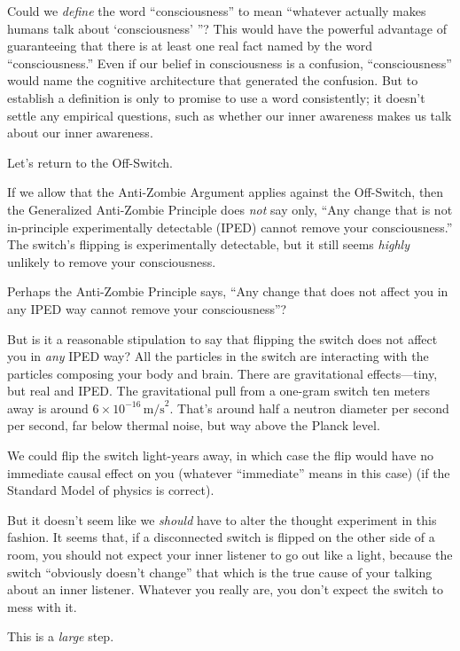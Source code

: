 {
 Could we \textit{define} the word
``consciousness'' to mean
``whatever actually makes humans talk about
`consciousness' ''?
This would have the powerful advantage of guaranteeing that there is at
least one real fact named by the word
``consciousness.'' Even if our
belief in consciousness is a confusion,
``consciousness'' would name the
cognitive architecture that generated the confusion. But to establish a
definition is only to promise to use a word consistently; it
doesn't settle any empirical questions, such as whether
our inner awareness makes us talk about our inner awareness.}

{
 Let's return to the Off-Switch.}

{
 If we allow that the Anti-Zombie Argument applies against the
Off-Switch, then the Generalized Anti-Zombie Principle does
\textit{not} say only, ``Any change that is not
in-principle experimentally detectable (IPED) cannot remove your
consciousness.'' The switch's
flipping is experimentally detectable, but it still seems
\textit{highly} unlikely to remove your consciousness.}

{
 Perhaps the Anti-Zombie Principle says, ``Any
change that does not affect you in any IPED way cannot remove your
consciousness''?}

{
 But is it a reasonable stipulation to say that flipping the switch
does not affect you in \textit{any} IPED way? All the particles in the
switch are interacting with the particles composing your body and
brain. There are gravitational effects---tiny, but real and IPED. The
gravitational pull from a one-gram switch ten meters away is around $6 \times
 10^{-16}\, \mathrm{m/s}^2$.
That's around half a neutron diameter per second per
second, far below thermal noise, but way above the Planck level.}

{
 We could flip the switch light-years away, in which case the flip
would have no immediate causal effect on you (whatever
``immediate'' means in this case)
(if the Standard Model of physics is correct).}

{
 But it doesn't seem like we \textit{should} have
to alter the thought experiment in this fashion. It seems that, if a
disconnected switch is flipped on the other side of a room, you should
not expect your inner listener to go out like a light, because the
switch ``obviously doesn't
change'' that which is the true cause of your talking
about an inner listener. Whatever you really are, you
don't expect the switch to mess with it.}

{
 This is a \textit{large} step.}

